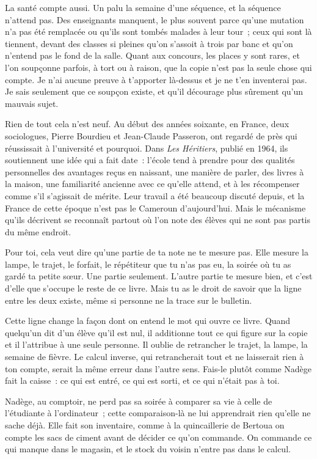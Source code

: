 \documentclass[10.5pt,twoside,openright]{book}
\begin{document}
La santé compte aussi. Un palu la semaine d’une séquence, et la séquence n’attend pas. Des enseignants manquent, le plus souvent parce qu’une mutation n’a pas été remplacée ou qu’ils sont tombés malades à leur tour ; ceux qui sont là tiennent, devant des classes si pleines qu’on s’assoit à trois par banc et qu’on n’entend pas le fond de la salle. Quant aux concours, les places y sont rares, et l’on soupçonne parfois, à tort ou à raison, que la copie n’est pas la seule chose qui compte. Je n’ai aucune preuve à t’apporter là-dessus et je ne t’en inventerai pas. Je sais seulement que ce soupçon existe, et qu’il décourage plus sûrement qu’un mauvais sujet.

Rien de tout cela n’est neuf. Au début des années soixante, en France, deux sociologues, Pierre Bourdieu et Jean-Claude Passeron, ont regardé de près qui réussissait à l’université et pourquoi. Dans \emph{Les Héritiers}, publié en 1964, ils soutiennent une idée qui a fait date : l’école tend à prendre pour des qualités personnelles des avantages reçus en naissant, une manière de parler, des livres à la maison, une familiarité ancienne avec ce qu’elle attend, et à les récompenser comme s’il s’agissait de mérite. Leur travail a été beaucoup discuté depuis, et la France de cette époque n’est pas le Cameroun d’aujourd’hui. Mais le mécanisme qu’ils décrivent se reconnaît partout où l’on note des élèves qui ne sont pas partis du même endroit.

Pour toi, cela veut dire qu’une partie de ta note ne te mesure pas. Elle mesure la lampe, le trajet, le forfait, le répétiteur que tu n’as pas eu, la soirée où tu as gardé ta petite sœur. Une partie seulement. L’autre partie te mesure bien, et c’est d’elle que s’occupe le reste de ce livre. Mais tu as le droit de savoir que la ligne entre les deux existe, même si personne ne la trace sur le bulletin.

Cette ligne change la façon dont on entend le mot qui ouvre ce livre. Quand quelqu’un dit d’un élève qu’il est nul, il additionne tout ce qui figure sur la copie et il l’attribue à une seule personne. Il oublie de retrancher le trajet, la lampe, la semaine de fièvre. Le calcul inverse, qui retrancherait tout et ne laisserait rien à ton compte, serait la même erreur dans l’autre sens. Fais-le plutôt comme Nadège fait la caisse : ce qui est entré, ce qui est sorti, et ce qui n’était pas à toi.

Nadège, au comptoir, ne perd pas sa soirée à comparer sa vie à celle de l’étudiante à l’ordinateur ; cette comparaison-là ne lui apprendrait rien qu’elle ne sache déjà. Elle fait son inventaire, comme à la quincaillerie de Bertoua on compte les sacs de ciment avant de décider ce qu’on commande. On commande ce qui manque dans le magasin, et le stock du voisin n’entre pas dans le calcul.
\end{document}

